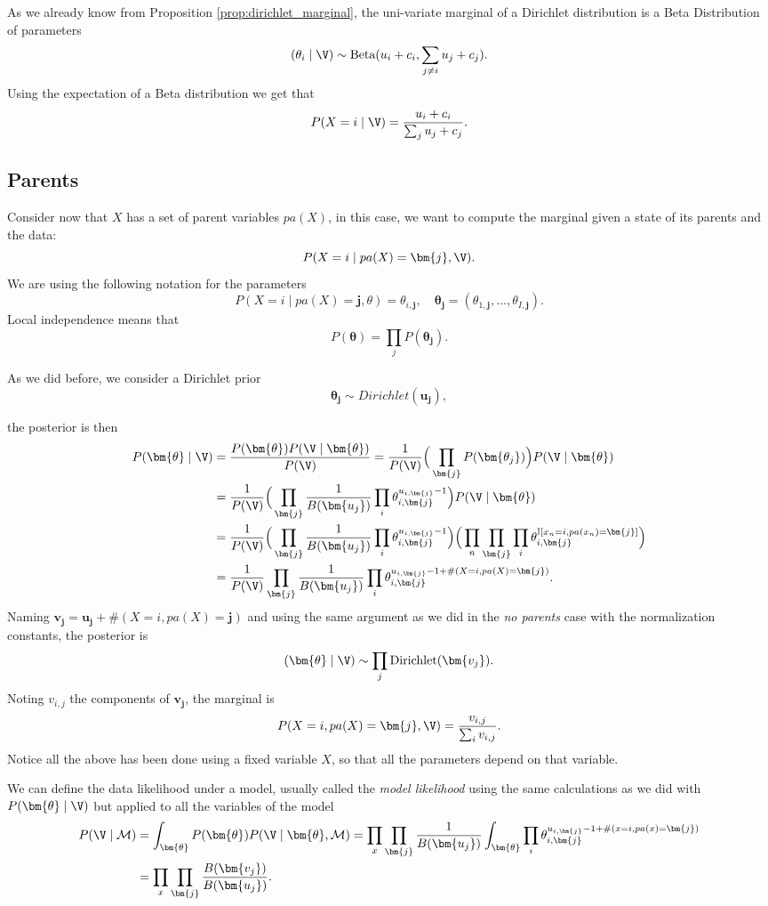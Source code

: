 As we already know from Proposition \ref{prop:dirichlet_marginal}, the uni-variate marginal of a Dirichlet distribution is a
Beta Distribution of parameters
\[
  (\theta_{i} \mid \V) \sim \text{Beta}(u_{i} + c_{i}, \sum_{j\neq i} u_{j} + c_{j}).
\]
Using the expectation of a Beta distribution we get that
\[
  P(X = i \mid \V) = \frac{u_{i} + c_{i}}{\sum_{j}u_{j} + c_{j}}.
\]

\subsection{Parents}
Consider now that \(X\) has a set of parent variables \(pa(X)\), in this case,
we want to compute the marginal given a state of its parents and the data:
\[
  P(X = i \mid pa(X) = \bm{j}, \V).
\]
We are using the following notation for the parameters
\[
  P(X = i \mid pa(X) = \bm{j}, \theta) = \theta_{i,\bm{j}}, \quad \bm{\theta_{j}} = (\theta_{1,\bm{j}},\dots, \theta_{I,\bm{j}}).
\]
Local independence means that
\[
  P(\bm{\theta}) = \prod_{j}P(\bm{\theta_{j}}).
\]

As we did before, we consider a Dirichlet prior
\[
  \bm{\theta_{j}} \sim Dirichlet(\bm{u_{j}}),
\]

the posterior is then
\[
  \begin{aligned}
    P(\bm{\theta} \mid \V) &= \frac{P(\bm{\theta})P(\V \mid \bm{\theta}) }{P(\V)} = \frac{1}{P(\V)}\Big(\prod_{\bm{j}}P(\bm{\theta_{j}}) \Big)P(\V \mid \bm{\theta}) \\
    &= \frac{1}{P(\V)}\Big(\prod_{\bm{j}}\frac{1}{B(\bm{u_{j}})}\prod_{i}\theta_{i,\bm{j}}^{u_{i,\bm{j}}-1}\Big) P(\V \mid \bm{\theta})\\
    &= \frac{1}{P(\V)}\Big(\prod_{\bm{j}}\frac{1}{B(\bm{u_{j}})}\prod_{i}\theta_{i,\bm{j}}^{u_{i,\bm{j}}-1}\Big) \Big(\prod_{n}\prod_{\bm{j}}\prod_{i} \theta_{i,\bm{j}}^{\mathbb{I}[x_{n} = i, pa(x_{n}) = \bm{j}]}\Big)\\
    &= \frac{1}{P(\V)}\prod_{\bm{j}}\frac{1}{B(\bm{u_{j}})}\prod_{i}\theta_{i,\bm{j}}^{u_{i,\bm{j}}-1 + \#(X = i,pa(X)=\bm{j})}.
  \end{aligned}
\]
Naming \(\bm{v_{j}} = \bm{u_{j}} + \#(X = i, pa(X) = \bm{j})\) and using the same argument as we did in the \emph{no parents} case with the normalization constants, the posterior is
\[
  (\bm{\theta} \mid \V) \sim \prod_{j}\text{Dirichlet}(\bm{v_{j}}).
\]
Noting \(v_{i,j}\) the components of \(\bm{v_{j}}\), the marginal is
\[
  P(X=i, pa(X) = \bm{j}, \V) = \frac{v_{i,j}}{\sum_{i}v_{i,j}}.
\]
Notice all the above has been done using a fixed variable \(X\), so that all the parameters depend on that variable.

We can define the data likelihood under a model, usually called the \emph{model likelihood} using the same calculations as we did with \(P(\bm{\theta} \mid \V)\) but applied to all the variables of the model
\[
  \begin{aligned}
    P(\V \mid \mathcal{M}) &= \int_{\bm{\theta}}P(\bm{\theta})P(\V \mid \bm{\theta}, \mathcal{M}) = \prod_{x} \prod_{\bm{j}} \frac{1}{B(\bm{u_{j}})} \int_{\bm{\theta}} \prod_{i}\theta_{i,\bm{j}}^{u_{i,\bm{j}}-1 + \#(x = i,pa(x)=\bm{j})}\\
    &= \prod_{x}\prod_{\bm{j}} \frac{B(\bm{v_{j}})}{B(\bm{u_{j}})}.
  \end{aligned}
\]

